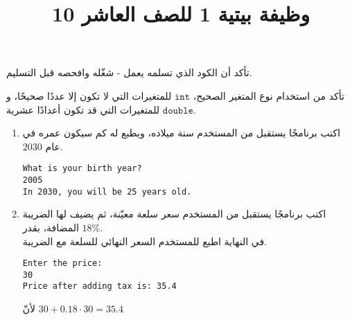 \documentclass[12pt]{article}
\title{وظيفة بيتية 1 للصف العاشر 10}
\begin{document}
\maketitle
\thispagestyle{fancy}

\begin{warning}
تأكد أن الكود الذي تسلمه يعمل - شغّله وافحصه قبل التسليم.
\end{warning}

\begin{note}
    تأكد من استخدام نوع المتغير الصحيح، $\mathtt{int}$ للمتغيرات التي لا تكون إلا عددًا صحيحًا، و $\mathtt{double}$ للمتغيرات التي قد تكون أعدادًا عشرية.
\end{note}

\begin{enumerate}

\vspace{1cm}
\item
اكتب برنامجًا يستقبل من المستخدم سنة ميلاده، ويطبع له كم سيكون عمره في عام 2030.
\begin{example}
\begin{english}
\begin{lstlisting}
What is your birth year?
2005
In 2030, you will be 25 years old.
\end{lstlisting}
\end{english}
\end{example}

\vspace{1cm}
\item
اكتب برنامجًا يستقبل من المستخدم سعر سلعة معيّنة، ثم يضيف لها الضريبة المضافة، بقدر $18\%$. \\
في النهاية اطبع للمستخدم السعر النهائي للسلعة مع الضريبة.

\begin{example}
\begin{english}
\begin{lstlisting}
Enter the price:
30
Price after adding tax is: 35.4
\end{lstlisting}
\end{english}
لأنّ $30 + 0.18 \cdot 30 = 35.4$
\end{example}


\end{enumerate}
\end{document}
